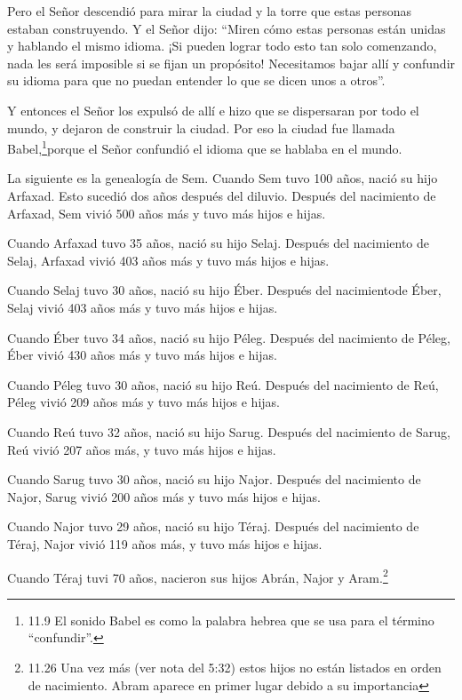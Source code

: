  Pero el Señor descendió para mirar la ciudad y la torre que
estas personas estaban construyendo.  Y el Señor dijo:
``Miren cómo estas personas están unidas y hablando el mismo idioma. ¡Si
pueden lograr todo esto tan solo comenzando, nada les será imposible si
se fijan un propósito!  Necesitamos bajar allí y confundir
su idioma para que no puedan entender lo que se dicen unos a otros''.

 Y entonces el Señor los expulsó de allí e hizo que se
dispersaran por todo el mundo, y dejaron de construir la ciudad.
 Por eso la ciudad fue llamada Babel,\footnote{11.9 El
  sonido Babel es como la palabra hebrea que se usa para el término
  ``confundir''.}porque el Señor confundió el idioma que se hablaba en
el mundo.

 La siguiente es la genealogía de Sem. Cuando Sem tuvo 100
años, nació su hijo Arfaxad. Esto sucedió dos años después del diluvio.
 Después del nacimiento de Arfaxad, Sem vivió 500 años más
y tuvo más hijos e hijas.

 Cuando Arfaxad tuvo 35 años, nació su hijo Selaj.
 Después del nacimiento de Selaj, Arfaxad vivió 403 años
más y tuvo más hijos e hijas.

 Cuando Selaj tuvo 30 años, nació su hijo Éber.
 Después del nacimientode Éber, Selaj vivió 403 años más y
tuvo más hijos e hijas.

 Cuando Éber tuvo 34 años, nació su hijo Péleg.
 Después del nacimiento de Péleg, Éber vivió 430 años más y
tuvo más hijos e hijas.

 Cuando Péleg tuvo 30 años, nació su hijo Reú.
 Después del nacimiento de Reú, Péleg vivió 209 años más y
tuvo más hijos e hijas.

 Cuando Reú tuvo 32 años, nació su hijo Sarug.
 Después del nacimiento de Sarug, Reú vivió 207 años más, y
tuvo más hijos e hijas.

 Cuando Sarug tuvo 30 años, nació su hijo Najor.
 Después del nacimiento de Najor, Sarug vivió 200 años más
y tuvo más hijos e hijas.

 Cuando Najor tuvo 29 años, nació su hijo Téraj.
 Después del nacimiento de Téraj, Najor vivió 119 años más,
y tuvo más hijos e hijas.

 Cuando Téraj tuvi 70 años, nacieron sus hijos Abrán, Najor
y Aram.\footnote{11.26 Una vez más (ver nota del 5:32) estos hijos no
  están listados en orden de nacimiento. Abram aparece en primer lugar
  debido a su importancia}

